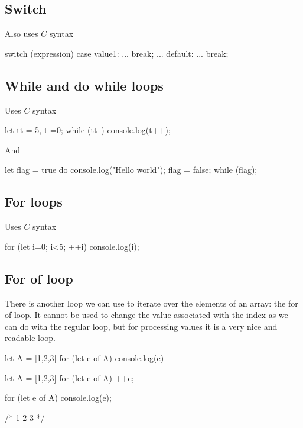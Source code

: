 \documentclass{report}
\begin{document}
    \bigbreak \noindent 
    \subsection{Switch}
    \bigbreak \noindent 
    Also uses $C$ syntax
    \bigbreak \noindent 
    \begin{jscode}
        switch (expression) {
            case value1:
                ...
                break;
            ...
            default:
                ...
                break;
        }
    \end{jscode}


    \pagebreak 
    \bigbreak \noindent 
    \subsection{While and do while loops}
    \bigbreak \noindent 
    Uses $C$ syntax
    \bigbreak \noindent 
    \begin{jscode}
    let tt = 5, t =0;
    while (tt--) {
        console.log(t++);
    }
    \end{jscode}
    \bigbreak \noindent 
    And
    \bigbreak \noindent 
    \begin{jscode}
    let flag = true
    do {
        console.log("Hello world");
        flag = false;
    } while (flag);
    \end{jscode}

    \bigbreak \noindent 
    \subsection{For loops}
    \bigbreak \noindent 
    Uses $C$ syntax
    \bigbreak \noindent 
    \begin{jscode}
        for (let i=0; i<5; ++i) {
            console.log(i);
        }
    \end{jscode}

    \bigbreak \noindent 
    \subsection{For of loop}
    \bigbreak \noindent 
    There is another loop we can use to iterate over the elements of an array: the for of loop. It cannot be used to change the value associated with the index as we can do with the regular loop, but for processing values it is a very nice and readable loop.
    \bigbreak \noindent 
    \begin{jscode}
        let A = [1,2,3]
        for (let e of A) {
            console.log(e)
        }
    \end{jscode}
    \bigbreak \noindent 
    \begin{jscode}
        let A = [1,2,3]
        for (let e of A) {
            ++e;
        }

        for (let e of A) {
            console.log(e);
        }

        /*
        1
        2
        3
        */
    \end{jscode}
\end{document}
